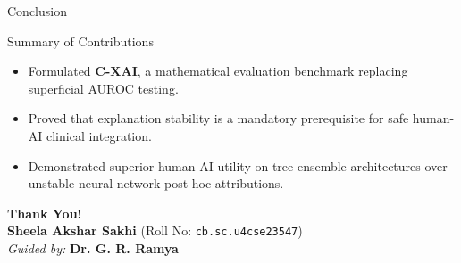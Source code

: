 \documentclass[aspectratio=169,10pt]{beamer}
\begin{document}
\begin{frame}{Conclusion}
  \begin{block}{Summary of Contributions}
    \begin{itemize}
      \item Formulated \textbf{C-XAI}, a mathematical evaluation benchmark replacing superficial AUROC testing.
      \item Proved that explanation stability is a mandatory prerequisite for safe human-AI clinical integration.
      \item Demonstrated superior human-AI utility on tree ensemble architectures over unstable neural network post-hoc attributions.
    \end{itemize}
  \end{block}

  \centering
  \vspace{0.4cm}
  \Large \textbf{Thank You!} \\
  \vspace{0.15cm}
  \small \textbf{Sheela Akshar Sakhi} (Roll No: \texttt{cb.sc.u4cse23547}) \\
  \small \textit{Guided by:} \textbf{Dr. G. R. Ramya}
\end{frame}
\end{document}
